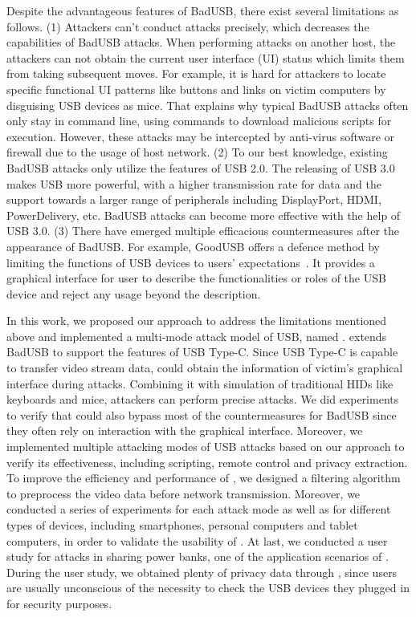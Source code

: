 Despite the advantageous features of BadUSB, there exist several limitations as follows.
(1) Attackers can't conduct attacks precisely, which decreases the capabilities of BadUSB attacks.
When performing attacks on another host, the attackers can not obtain the current user interface (UI) status which limits them from taking subsequent moves.
For example, it is hard for attackers to locate specific functional UI patterns like buttons and links on victim computers by disguising USB devices as mice.
That explains why typical BadUSB attacks often only stay in command line, using commands to download malicious scripts for execution.
However, these attacks may be intercepted by anti-virus software or firewall due to the usage of host network.
(2) To our best knowledge, existing BadUSB attacks only utilize the features of USB 2.0.
The releasing of USB 3.0 makes USB more powerful, with a higher transmission rate for data and the support towards a larger range of peripherals including DisplayPort, HDMI, PowerDelivery, etc.
BadUSB attacks can become more effective with the help of USB 3.0.
(3) There have emerged multiple efficacious countermeasures after the appearance of BadUSB.
For example, GoodUSB offers a defence method by limiting the functions of USB devices to users' expectations~\cite{tian2015defending}.
It provides a graphical interface for user to describe the functionalities or roles of the USB device and reject any usage beyond the description.

In this work, we proposed our approach to address the limitations mentioned above and implemented a multi-mode attack model of USB, named \tool.
\tool extends BadUSB to support the features of USB Type-C.
Since USB Type-C is capable to transfer video stream data, \tool could obtain the information of victim's graphical interface during attacks.
Combining it with simulation of traditional HIDs like keyboards and mice, attackers can perform precise attacks.
We did experiments to verify that \tool could also bypass most of the countermeasures for BadUSB since they often rely on interaction with the graphical interface.
Moreover, we implemented multiple attacking modes of USB attacks based on our approach to verify its effectiveness, including scripting, remote control and privacy extraction.
To improve the efficiency and performance of \tool, we designed a filtering algorithm to preprocess the video data before network transmission.
Moreover, we conducted a series of experiments for each attack mode as well as for different types of devices, including smartphones, personal computers and tablet computers, in order to validate the usability of \tool.
At last, we conducted a user study for attacks in sharing power banks, one of the application scenarios of \tool.
During the user study, we obtained plenty of privacy data through \tool, since users are usually unconscious of the necessity to check the USB devices they plugged in for security purposes.

